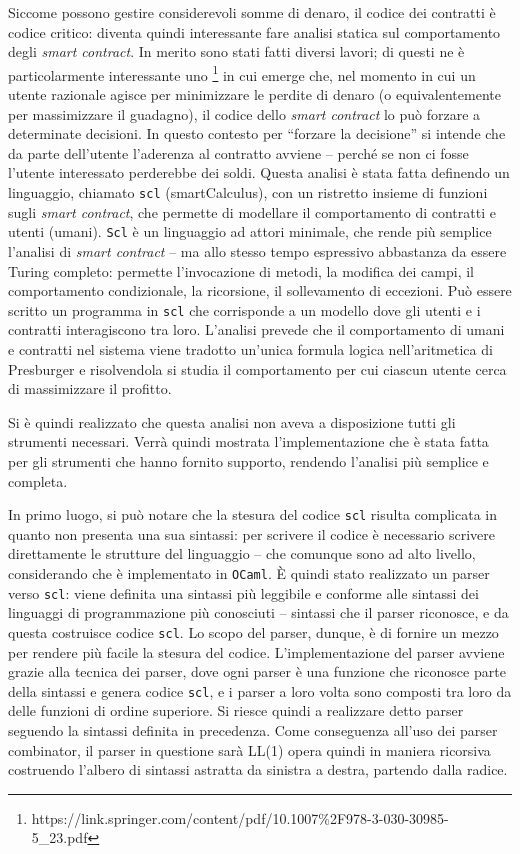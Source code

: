 \documentclass[]{article}
\begin{document}
Siccome possono gestire considerevoli somme di denaro, il codice dei
contratti è codice critico: diventa quindi interessante fare analisi
statica sul comportamento degli \emph{smart contract}. In merito sono
stati fatti diversi lavori; di questi ne è particolarmente interessante
uno \footnote{https://link.springer.com/content/pdf/10.1007\%2F978-3-030-30985-5\_23.pdf}
in cui emerge che, nel momento in cui un utente razionale agisce per
minimizzare le perdite di denaro (o equivalentemente per massimizzare il
guadagno), il codice dello \emph{smart contract} lo può forzare a
determinate decisioni. In questo contesto per ``forzare la decisione''
si intende che da parte dell'utente l'aderenza al contratto avviene --
perché se non ci fosse l'utente interessato perderebbe dei soldi. Questa
analisi è stata fatta definendo un linguaggio, chiamato \texttt{scl}
(smartCalculus), con un ristretto insieme di funzioni sugli \emph{smart
contract}, che permette di modellare il comportamento di contratti e
utenti (umani). \texttt{Scl} è un linguaggio ad attori minimale, che
rende più semplice l'analisi di \emph{smart contract} -- ma allo stesso
tempo espressivo abbastanza da essere Turing completo: permette
l'invocazione di metodi, la modifica dei campi, il comportamento
condizionale, la ricorsione, il sollevamento di eccezioni. Può essere
scritto un programma in \texttt{scl} che corrisponde a un modello dove
gli utenti e i contratti interagiscono tra loro. L'analisi prevede che
il comportamento di umani e contratti nel sistema viene tradotto
un'unica formula logica nell'aritmetica di Presburger e risolvendola si
studia il comportamento per cui ciascun utente cerca di massimizzare il
profitto.

Si è quindi realizzato che questa analisi non aveva a disposizione tutti
gli strumenti necessari. Verrà quindi mostrata l'implementazione che è
stata fatta per gli strumenti che hanno fornito supporto, rendendo
l'analisi più semplice e completa.

In primo luogo, si può notare che la stesura del codice \texttt{scl}
risulta complicata in quanto non presenta una sua sintassi: per scrivere
il codice è necessario scrivere direttamente le strutture del linguaggio
-- che comunque sono ad alto livello, considerando che è implementato in
\texttt{OCaml}. È quindi stato realizzato un parser verso \texttt{scl}:
viene definita una sintassi più leggibile e conforme alle sintassi dei
linguaggi di programmazione più conosciuti -- sintassi che il parser
riconosce, e da questa costruisce codice \texttt{scl}. Lo scopo del
parser, dunque, è di fornire un mezzo per rendere più facile la stesura
del codice. L'implementazione del parser avviene grazie alla tecnica dei
parser, dove ogni parser è una funzione che riconosce parte della
sintassi e genera codice \texttt{scl}, e i parser a loro volta sono
composti tra loro da delle funzioni di ordine superiore. Si riesce
quindi a realizzare detto parser seguendo la sintassi definita in
precedenza. Come conseguenza all'uso dei parser combinator, il parser in
questione sarà LL(1) opera quindi in maniera ricorsiva costruendo
l'albero di sintassi astratta da sinistra a destra, partendo dalla
radice.
\end{document}
